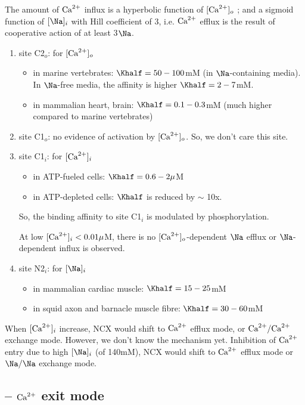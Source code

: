 The amount of ${\text{Ca}^{2+}}$ influx is a hyperbolic function of $[{\text{Ca}^{2+}}]_o$ ; and
a sigmoid function of $[\Na]_i$ with Hill coefficient of 3, i.e. ${\text{Ca}^{2+}}$
efflux is the result of cooperative action of at least 3$\Na$.
\begin{enumerate}
\item site C2$_o$: for $[{\text{Ca}^{2+}}]_o$
  \begin{itemize}
  \item in marine vertebrates: $\Khalf=50-100$mM (in $\Na$-containing
    media). In $\Na$-free media, the affinity is higher $\Khalf=2-7$mM.
  \item in mammalian heart, brain:  $\Khalf = 0.1-0.3$mM (much higher
    compared to marine vertebrates)
  \end{itemize}

\item site C1$_o$: no evidence of activation by $[{\text{Ca}^{2+}}]_o$. So, we
  don't care this site.

\item site C1$_i$: for $[{\text{Ca}^{2+}}]_i$
  \begin{itemize}
  \item in ATP-fueled cells: $\Khalf = 0.6-2\mu$M
  \item in ATP-depleted cells: $\Khalf$ is reduced by $\sim$ 10x. 
  \end{itemize}
  So, the binding affinity to site C1$_i$ is modulated by
  phosphorylation. 

  At low $[{\text{Ca}^{2+}}]_i< 0.01\mu$M, there is no $[{\text{Ca}^{2+}}]_o$-dependent $\Na$
  efflux or $\Na$-dependent influx is observed.

\item site N2$_i$: for $[\Na]_i$
  \begin{itemize}
  \item in mammalian cardiac muscle: $\Khalf = 15-25$mM
  \item in squid axon and barnacle muscle fibre: $\Khalf = 30-60$mM
  \end{itemize}
\end{enumerate}

When $[{\text{Ca}^{2+}}]_i$ increase, NCX would shift to ${\text{Ca}^{2+}}$ efflux mode, or
${\text{Ca}^{2+}}/{\text{Ca}^{2+}}$ exchange mode. However, we don't know the mechanism yet.
Inhibition of ${\text{Ca}^{2+}}$ entry due to high $[\Na]_i$ (of 140mM), NCX would
shift to ${\text{Ca}^{2+}}$ efflux mode or $\Na/\Na$ exchange mode.

\subsection{-- ${\text{Ca}^{2+}}$ exit mode}
\label{sec:calcium-exit-mode}

